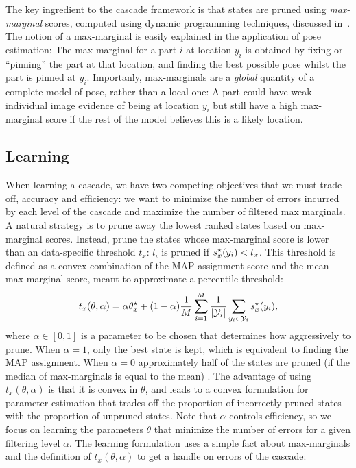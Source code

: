 The key ingredient to the cascade framework is that states are pruned using 
{\em max-marginal} scores, computed using dynamic programming techniques, 
discussed in~.  The notion of a max-marginal is easily 
explained in the application of pose estimation:  The max-marginal for a part 
$i$ at location $y_i$ is obtained by fixing or ``pinning'' the part at that 
location, and finding the best possible pose whilst the part is pinned at 
$y_i$.
Importanly, max-marginals are a {\em global} quantity of a complete model of 
pose, rather than a local one: A part could have weak individual image evidence 
of being at location $y_i$ but still have a high max-marginal score if the rest 
of the model believes this is a likely location. 


\subsection{Learning}
When learning a cascade, we have two competing objectives that we must trade off,
accuracy and efficiency: we want to minimize the number of errors incurred by each
level of the cascade  and maximize the number of filtered max marginals.  A natural strategy is to prune away the lowest ranked states based on max-marginal scores. Instead, \cite{cascades} prune the states whose max-marginal score is lower than an data-specific threshold $t_x$: $l_i$ is pruned if $s^\star_x(y_i) < t_x$.  This threshold is defined as a convex combination of the MAP assignment score and the mean max-marginal score, meant to approximate a percentile threshold: $$t_x(\theta,\alpha) = \alpha \theta^\star_x + (1-\alpha)\frac{1}{M}\sum_{i=1}^M\frac{1}{|\mathcal{Y}_i|}\sum_{y_i \in \mathcal{Y}_i} s^\star_x(y_i),$$ where $\alpha\in[0,1]$ is a parameter to be chosen that determines how aggressively to prune. When $\alpha = 1$, only the best state is kept, which is equivalent to finding the MAP assignment.  When $\alpha = 0$ approximately half of the states are pruned (if the median of max-marginals is equal to the mean) .  The advantage of using  $t_x(\theta,\alpha)$ is that it is convex in $\theta$, and leads to a convex formulation for parameter estimation that trades off the proportion of incorrectly pruned states with the proportion of unpruned states.
Note that  $\alpha$ controls efficiency, so we focus on learning the parameters $\theta$ that 
minimize the number of errors for a given filtering level $\alpha$.   The learning formulation uses a simple fact about max-marginals and the definition of $t_x(\theta,\alpha)$
to get a handle on errors of the cascade:
